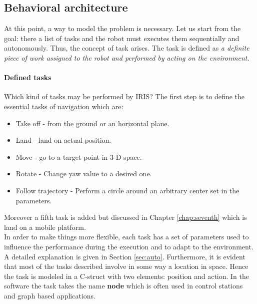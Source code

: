 \subsection{Behavioral architecture}
\label{sec:behav}
At this point, a way to model the problem is necessary. Let us start from the goal: there a list of tasks and the robot must executes them sequentially and autonomously. Thus, the concept of task arises. The task is defined as \textit{a definite piece of work assigned to the robot and performed by acting on the environment}. 

\paragraph{Defined tasks} Which kind of tasks may be performed by IRIS? The first step is to define the essential tasks of navigation which are:
\begin{itemize}
\item Take off - from the ground or an horizontal plane.
\item Land - land on actual position.
\item Move - go to a target point in 3-D space.
\item Rotate - Change yaw value to a desired one.
\item Follow trajectory - Perform a circle around an arbitrary center set in the parameters.
\end{itemize}
Moreover a fifth task is added but discussed in Chapter \ref{chap:seventh} which is land on a mobile platform. \newline \\
In order to make things more flexible, each task has a set of parameters used to influence the performance during the execution and to adapt to the environment. A detailed explanation is given in Section \ref{sec:auto}. Furthermore, it is evident that most of the tasks described involve in some way a location in space. Hence the task is modeled in a C-struct with two elements: position and action. In the software the task takes the name \textbf{node} which is often used in control stations and graph based applications.

